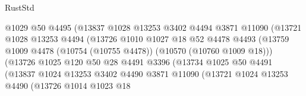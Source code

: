 \begin{lexlean}{RustStd}
\begin{coremodule}
                                    @1029
                                    @50
                                    @4495
                                    (@13837
                                      @1028
                                      @13253
                                      @3402
                                      @4494
                                      @3871
                                      @11090
                                      (@13721
                                        @1028
                                        @13253
                                        @4494
                                        (@13726
                                          @1010
                                          @1027
                                          @18
                                          @52
                                          @4478
                                          @4493
                                          (@13759
                                            @1009
                                            @4478
                                            (@10754 (@10755 @4478))
                                            (@10570 (@10760 @1009 @18)))
                                          (@13726
                                            @1025
                                            @120
                                            @50
                                            @28
                                            @4491
                                            @3396
                                            (@13734
                                              @1025
                                              @50
                                              @4491
                                              (@13837
                                                @1024
                                                @13253
                                                @3402
                                                @4490
                                                @3871
                                                @11090
                                                (@13721
                                                  @1024
                                                  @13253
                                                  @4490
                                                  (@13726
                                                    @1014
                                                    @1023
                                                    @18

\end{coremodule}
\end{lexlean}
